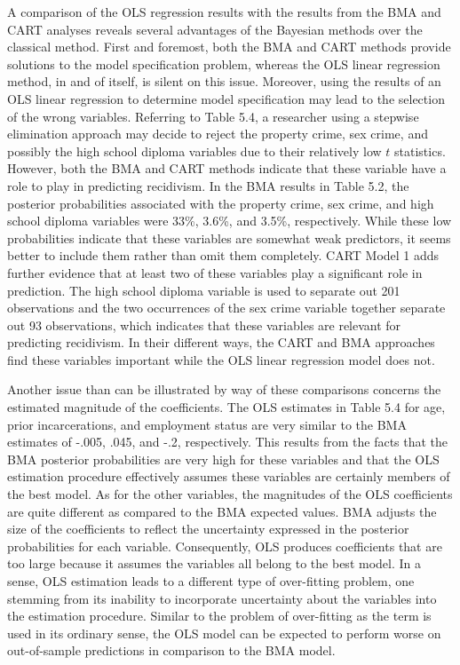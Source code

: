 A comparison of the OLS regression results with the results from the BMA and CART analyses reveals several advantages of the Bayesian methods over the classical method.  First and foremost, both the BMA and CART methods provide solutions to the model specification problem, whereas the OLS linear regression method, in and of itself, is silent on this issue.  Moreover, using the results of an OLS linear regression to determine model specification may lead to the selection of the wrong variables.  Referring to Table 5.4, a researcher using a stepwise elimination approach may decide to reject the property crime, sex crime, and possibly the high school diploma variables due to their relatively low $t$ statistics.  However, both the BMA and CART methods indicate that these variable have a role to play in predicting recidivism.  In the BMA results in Table 5.2, the posterior probabilities associated with the property crime, sex crime, and high school diploma variables were 33\%, 3.6\%, and 3.5\%, respectively.  While these low probabilities indicate that these variables are somewhat weak predictors, it seems better to include them rather than omit them completely.  CART Model 1 adds further evidence that at least two of these variables play a significant role in prediction.  The high school diploma variable is used to separate out 201 observations and the two occurrences of the sex crime variable together separate out 93 observations, which indicates that these variables are relevant for predicting recidivism.  In their different ways, the CART and BMA approaches find these variables important while the OLS linear regression model does not.

Another issue than can be illustrated by way of these comparisons concerns the estimated magnitude of the coefficients.  The OLS estimates in Table 5.4 for age, prior incarcerations, and employment status are very similar to the BMA estimates of -.005, .045, and -.2, respectively.  This results from the facts that the BMA posterior probabilities are very high for these variables and that the OLS estimation procedure effectively assumes these variables are certainly members of the best model.  As for the other variables, the magnitudes of the OLS coefficients are quite different as compared to the BMA expected values.  BMA adjusts the size of the coefficients to reflect the uncertainty expressed in the posterior probabilities for each variable.  Consequently, OLS produces coefficients that are too large because it assumes the variables all belong to the best model.  In a sense, OLS estimation leads to a different type of over-fitting problem, one stemming from its inability to incorporate uncertainty about the variables into the estimation procedure.  Similar to the problem of over-fitting as the term is used in its ordinary sense, the OLS model can be expected to perform worse on out-of-sample predictions in comparison to the BMA model.

